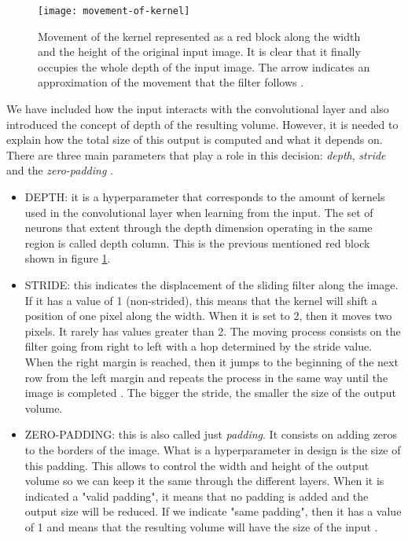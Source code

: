 	\begin{figure}[ht]
		\centering
		\captionsetup{justification=centering}
		\texttt{[image: movement-of-kernel]}
		\caption{Movement of the kernel represented as a red block along the width and the height of the original input image. It is clear that it finally occupies the whole depth of the input image. The arrow indicates an approximation of the movement that the filter follows \cite{Saha2018}.}
		\label{fig:mesh11}
	\end{figure}

	We have included how the input interacts with the convolutional layer and also introduced the concept of depth of the resulting volume. However, it is needed to explain how the total size of this output is computed and what it depends on. There are three main parameters that play a role in this decision: \textit{depth}, \textit{stride} and the \textit{zero-padding} \cite{Karpathy2016}.
	
	\begin{itemize}
		\item DEPTH: it is a hyperparameter that corresponds to the amount of kernels used in the convolutional layer when learning from the input.  The set of neurons that extent through the depth dimension operating in the same region is called depth column. This is the previous mentioned red block shown in figure \ref{fig:mesh11}.
		\item STRIDE: this indicates the displacement of the sliding filter along the image. If it has a value of 1 (non-strided), this means that the kernel will shift a position of one pixel along the width. When it is set to 2, then it moves two pixels. It rarely has values greater than 2. The moving process consists on the filter going from right to left with a hop determined by the stride value. When the right margin is reached, then it jumps to the beginning of the next row from the left margin and repeats the process in the same way until the image is completed \cite{Saha2018}. The bigger the stride, the smaller the size of the output volume.
		\item ZERO-PADDING: this is also called just \textit{padding}. It consists on adding zeros to the borders of the image. What is a hyperparameter in design is the size of this padding. This allows to control the width and height of the output volume so we can keep it the same through the different layers. When it is indicated a "valid padding", it means that no padding is added and the output size will be reduced. If we indicate "same padding", then it has a value of 1 and means that the resulting volume will have the size of the input \cite{Keras}.
	\end{itemize}

